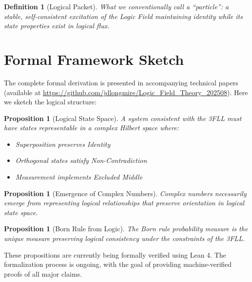 \documentclass[12pt,a4paper]{article}
\newtheorem{proposition}[theorem]{Proposition}
\newtheorem{definition}{Definition}
\begin{document}
\begin{definition}[Logical Packet]
What we conventionally call a ``particle'': a stable, self-consistent excitation of the Logic Field maintaining identity while its state properties exist in logical flux.
\end{definition}

\section{Formal Framework Sketch}

The complete formal derivation is presented in accompanying technical papers (available at \url{https://github.com/jdlongmire/Logic_Field_Theory_202508}). Here we sketch the logical structure:

\begin{proposition}[Logical State Space]
A system consistent with the 3FLL must have states representable in a complex Hilbert space where:
\begin{itemize}
\item Superposition preserves Identity
\item Orthogonal states satisfy Non-Contradiction
\item Measurement implements Excluded Middle
\end{itemize}
\end{proposition}

\begin{proposition}[Emergence of Complex Numbers]
Complex numbers necessarily emerge from representing logical relationships that preserve orientation in logical state space.
\end{proposition}

\begin{proposition}[Born Rule from Logic]
The Born rule probability measure is the unique measure preserving logical consistency under the constraints of the 3FLL.
\end{proposition}

These propositions are currently being formally verified using Lean 4. The formalization process is ongoing, with the goal of providing machine-verified proofs of all major claims.
\end{document}
